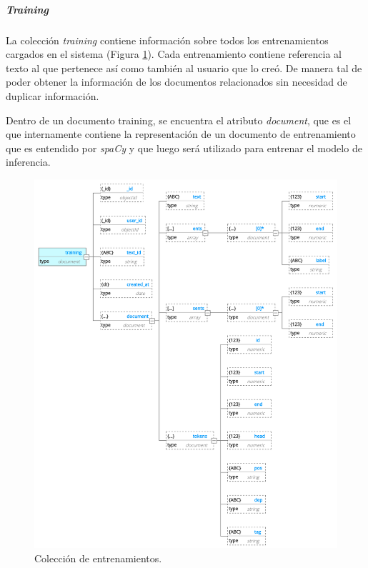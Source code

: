 \documentclass[12pt,a4paper,]{scrartcl}
\let\oldsubparagraph\subparagraph
\renewcommand{\subparagraph}[1]{\oldsubparagraph{#1}\mbox{}}
\begin{document}
\hypertarget{training}{%
\subparagraph{\texorpdfstring{\emph{Training}}{Training}}\label{training}}

La colección \emph{training} contiene información sobre todos los entrenamientos cargados en el sistema (Figura \ref{fig:developer-db-training}). Cada entrenamiento contiene referencia al texto al que pertenece así como también al usuario que lo creó. De manera tal de poder obtener la información de los documentos relacionados sin necesidad de duplicar información.

Dentro de un documento training, se encuentra el atributo \emph{document}, que es el que internamente contiene la representación de un documento de entrenamiento que es entendido por \emph{spaCy} y que luego será utilizado para entrenar el modelo de inferencia.

\begin{figure}[H]

{\centering \includegraphics{assets/developer/db-training.pdf} 

}

\caption{Colección de entrenamientos.}\label{fig:developer-db-training}
\end{figure}
\end{document}
